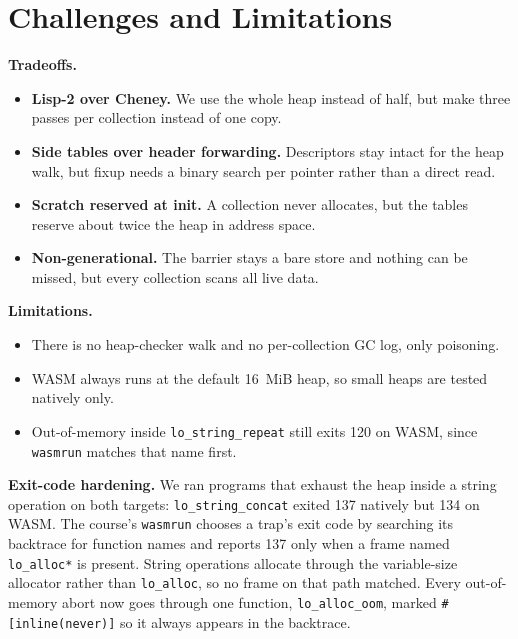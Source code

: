 \documentclass[10pt]{article}
\newcommand{\code}[1]{\texttt{\small #1}}
\begin{document}
\section{Challenges and Limitations}
\textbf{Tradeoffs.}
\begin{itemize}
  \item \textbf{Lisp-2 over Cheney.} We use the whole heap instead of half, but make three passes per collection instead of one copy.
  \item \textbf{Side tables over header forwarding.} Descriptors stay intact for the heap walk, but fixup needs a binary search per pointer rather than a direct read.
  \item \textbf{Scratch reserved at init.} A collection never allocates, but the tables reserve about twice the heap in address space.
  \item \textbf{Non-generational.} The barrier stays a bare store and nothing can be missed, but every collection scans all live data.
\end{itemize}
\textbf{Limitations.}
\begin{itemize}
  \item There is no heap-checker walk and no per-collection GC log, only poisoning.
  \item WASM always runs at the default 16~MiB heap, so small heaps are tested natively only.
  \item Out-of-memory inside \code{lo\_string\_repeat} still exits 120 on WASM, since \code{wasmrun} matches that name first.
\end{itemize}
\textbf{Exit-code hardening.} We ran programs that exhaust the heap inside a string operation on both targets: \code{lo\_string\_concat} exited 137 natively but 134 on WASM. The course's \code{wasmrun} chooses a trap's exit code by searching its backtrace for function names and reports 137 only when a frame named \code{lo\_alloc*} is present. String operations allocate through the variable-size allocator rather than \code{lo\_alloc}, so no frame on that path matched. Every out-of-memory abort now goes through one function, \code{lo\_alloc\_oom}, marked \code{\#[inline(never)]} so it always appears in the backtrace.
\end{document}
